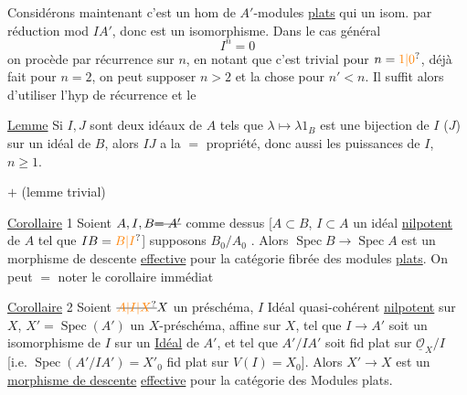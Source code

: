 Considérons maintenant  
c'est un hom de $A'$-modules \uline{plats} qui   un isom. par réduction mod $IA'$, donc est un isomorphisme.
Dans le cas général
\[
I^n=0
\]
on procède par récurrence sur $n$, en notant que c'est trivial pour $n=\unsure{1|0}$, déjà fait pour $n=2$, on peut supposer $n>2$ et la chose  pour $n'<n$.  Il suffit alors d'utiliser l'hyp de récurrence et le

\uline{Lemme} \quad Si $I,J$ sont deux idéaux de $A$ tels que $\lambda\mapsto\lambda 1_B$ est une bijection de $I$ ($J$) sur un idéal de $B$, alors $IJ$ a la $=$ propriété, donc aussi les puissances  de $I$,  $n\geq1$. 

$+$ \quad (lemme trivial)

\uline{Corollaire} 1 \quad Soient $A,I,B\deleted{=A'}$ comme dessus [$A\subset B$, $I\subset A$ un idéal \uline{nilpotent} de $A$ tel que $IB=\unsure{B|I}$]  supposons $B_0/A_0$  . Alors $\operatorname{Spec}B\longrightarrow\operatorname{Spec}A$ est un morphisme de descente \uline{effective} pour la catégorie fibrée des modules \uline{plats}.
On peut $=$ noter le corollaire immédiat

\uline{Corollaire} 2 \quad Soient $\deleted{\unsure{A|I|X}} X$ un préschéma, $I$  Idéal quasi-cohérent \uline{nilpotent} sur $X$, $X'=\operatorname{Spec}(A')$ un $X$-préschéma, affine sur $X$, tel que $I\longrightarrow A'$ soit un isomorphisme de $I$ sur un \uline{Idéal} de $A'$, et tel que $A'/IA'$ soit fid plat sur $\underline{\mathcal O}_X/I$ [i.e. $\operatorname{Spec}(A'/IA')=X'_0$ fid plat sur $V(I)=X_0$]. Alors $X'\longrightarrow X$ est un \uline{morphisme de descente} \uline{effective} pour la catégorie  des Modules  plats.

